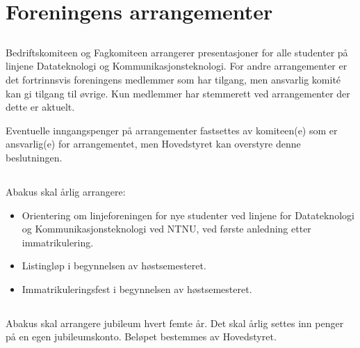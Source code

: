 \section{Foreningens arrangementer}

\subsection{}
Bedriftskomiteen og Fagkomiteen arrangerer presentasjoner for alle studenter på
linjene Datateknologi og Kommunikasjonsteknologi. For andre arrangementer er
det fortrinnsvis foreningens medlemmer som har tilgang, men ansvarlig komité
kan gi tilgang til øvrige. Kun medlemmer har stemmerett ved arrangementer der
dette er aktuelt.

Eventuelle inngangspenger på arrangementer fastsettes av komiteen(e) som er
ansvarlig(e) for arrangementet, men Hovedstyret kan overstyre denne beslutningen.

\subsection{}
Abakus skal årlig arrangere:

\begin{itemize}
  \item Orientering om linjeforeningen for nye studenter ved linjene for
        Datateknologi og Kommunikasjonsteknologi ved NTNU, ved første anledning etter immatrikulering.
  \item Listingløp i begynnelsen av høstsemesteret.
  \item Immatrikuleringsfest i begynnelsen av høstsemesteret.
\end{itemize}

\subsection{}
Abakus skal arrangere jubileum hvert femte år. Det skal årlig settes inn penger
på en egen jubileumskonto. Beløpet bestemmes av Hovedstyret.
